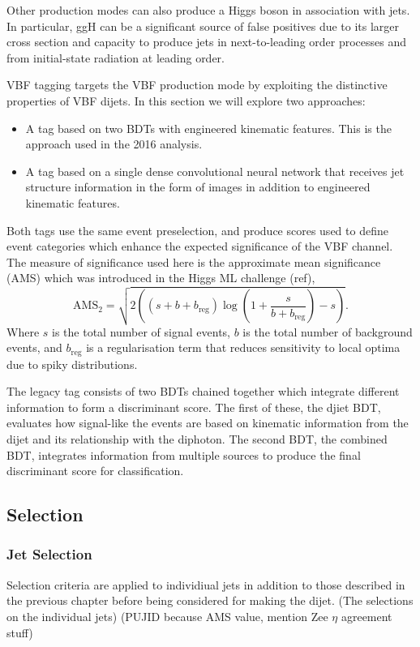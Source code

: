 Other production modes can also produce a Higgs boson in association with jets. In particular, ggH can be a significant source of false positives due to its larger cross section and capacity to produce jets in next-to-leading order processes and from initial-state radiation at leading order. 

VBF tagging targets the VBF production mode by exploiting the distinctive properties of VBF dijets. In this section we will explore two approaches:
\begin{itemize}[leftmargin=.5in,noitemsep]
    \item A tag based on two BDTs with engineered kinematic features. This is the approach used in the 2016 \Hgg analysis. 
    \item A tag based on a single dense convolutional neural network that receives jet structure information in the form of images in addition to engineered kinematic features. 
\end{itemize}
Both tags use the same event preselection, and produce scores used to define event categories which enhance the expected significance of the VBF channel. 
The measure of significance used here is the approximate mean significance (AMS) which was introduced in the Higgs ML challenge (ref),
\begin{equation}
    \mathrm{AMS}_{2} = \sqrt{2\left( (s+b+b_{\mathrm{reg}})\log\left(1 + \frac{s}{b+b_{\mathrm{reg}}}\right) - s \right)}.
\end{equation}
Where $s$ is the total number of signal events, $b$ is the total number of background events, and $b_{\mathrm{reg}}$ is a regularisation term that reduces sensitivity to local optima due to spiky distributions. 

The legacy tag consists of two BDTs chained together which integrate different information to form a discriminant score. 
The first of these, the djiet BDT, evaluates how signal-like the events are based on kinematic information from the dijet and its relationship with the diphoton. 
The second BDT, the combined BDT, integrates information from multiple sources to produce the final discriminant score for classification. 

\subsection{Selection}

\subsubsection{Jet Selection}
Selection criteria are applied to individiual jets in addition to those described in the previous chapter before being considered for making the dijet. 
(The selections on the individual jets)
(PUJID because AMS value, mention Zee $\eta$ agreement stuff)




